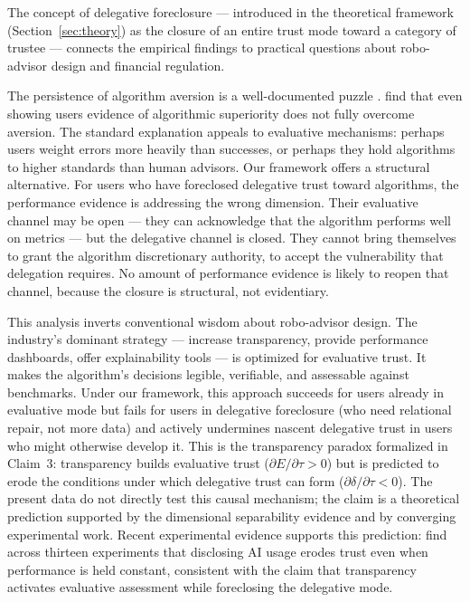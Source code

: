 The concept of delegative foreclosure --- introduced in the theoretical framework (Section~\ref{sec:theory}) as the closure of an entire trust mode toward a category of trustee --- connects the empirical findings to practical questions about robo-advisor design and financial regulation.

The persistence of algorithm aversion is a well-documented puzzle \citep[see also][]{BelancheCasaloFlavian2019, HuangEtAl2026}. \citet{DietvorstSimmonsMassey2015} find that even showing users evidence of algorithmic superiority does not fully overcome aversion. The standard explanation appeals to evaluative mechanisms: perhaps users weight errors more heavily than successes, or perhaps they hold algorithms to higher standards than human advisors. Our framework offers a structural alternative. For users who have foreclosed delegative trust toward algorithms, the performance evidence is addressing the wrong dimension. Their evaluative channel may be open --- they can acknowledge that the algorithm performs well on metrics --- but the delegative channel is closed. They cannot bring themselves to grant the algorithm discretionary authority, to accept the vulnerability that delegation requires. No amount of performance evidence is likely to reopen that channel, because the closure is structural, not evidentiary.

This analysis inverts conventional wisdom about robo-advisor design. The industry's dominant strategy --- increase transparency, provide performance dashboards, offer explainability tools --- is optimized for evaluative trust. It makes the algorithm's decisions legible, verifiable, and assessable against benchmarks. Under our framework, this approach succeeds for users already in evaluative mode \citep[who may appreciate the algorithm per][]{LoggMinsonMoore2019} but fails for users in delegative foreclosure (who need relational repair, not more data) and actively undermines nascent delegative trust in users who might otherwise develop it. This is the transparency paradox formalized in Claim~3: transparency builds evaluative trust ($\partial E/\partial \tau > 0$) but is predicted to erode the conditions under which delegative trust can form ($\partial \delta/\partial \tau < 0$). The present data do not directly test this causal mechanism; the claim is a theoretical prediction supported by the dimensional separability evidence and by converging experimental work. Recent experimental evidence supports this prediction: \citet{SchilkeReimann2025} find across thirteen experiments that disclosing AI usage erodes trust even when performance is held constant, consistent with the claim that transparency activates evaluative assessment while foreclosing the delegative mode.

